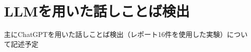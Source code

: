 \chapter{LLMを用いた話しことば検出}

主にChatGPTを用いた話しことば検出（レポート16件を使用した実験）について記述予定
\begin{comment}
書きことばリストは、話しことばチェッカーで検出しない表現をもとに選んでいる。
それでもchatGPTが出力する場合は、チェッカーの癖もあり得る。← これは要相談
\end{comment}